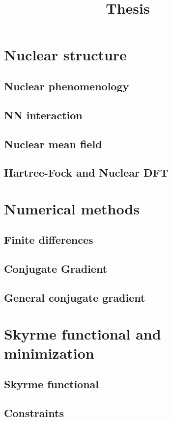 \documentclass{book}
\title{Thesis}
\date{}
\begin{document}
\maketitle
\tableofcontents

\chapter{Nuclear structure}
\section{Nuclear phenomenology}
\section{NN interaction}
\section{Nuclear mean field}
\section{Hartree-Fock and Nuclear DFT}

\chapter{Numerical methods}
\section{Finite differences}
\section{Conjugate Gradient}
\section{General conjugate gradient}

\chapter{Skyrme functional and minimization}
\section{Skyrme functional}
\section{Constraints}
\end{document}

